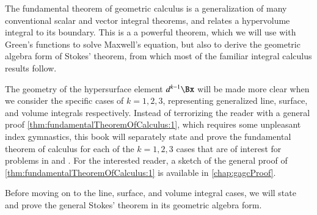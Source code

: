 %
%

The fundamental theorem of geometric calculus is a generalization of many conventional scalar and vector integral theorems, and relates a hypervolume integral to its boundary.
This is a a powerful theorem, which we will use with Green's functions to solve Maxwell's equation, but also to derive the geometric algebra form of Stokes' theorem, from which most of the familiar integral calculus results follow.

The geometry of the hypersurface element \( d^{k-1} \Bx \) will be made more clear when we
consider the specific cases of \( k = 1, 2, 3 \), representing generalized line, surface, and volume integrals respectively.
Instead of terrorizing the reader with a general proof
\cref{thm:fundamentalTheoremOfCalculus:1},
which requires some unpleasant index gymnastics,
this book
will separately state and prove the fundamental theorem of calculus
for each of the \( k = 1, 2, 3 \) cases that are of interest for problems in  and .
For the interested reader, a sketch of the general proof
of \cref{thm:fundamentalTheoremOfCalculus:1}
is available in \cref{chap:gagcProof}.

Before moving on to the line, surface, and volume integral cases, we will state and prove the
general Stokes' theorem in its geometric algebra form.

